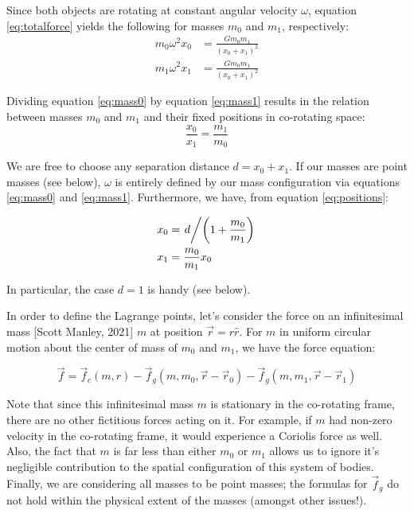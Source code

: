 \documentclass[twoside,11pt]{article}
\begin{document}
Since both objects are rotating at constant angular velocity $\omega$, equation \eqref{eq:totalforce} yields the following for masses $m_0$ and $m_1$, respectively:
\begin{align}
m_0 \omega^2 x_0 &= \frac{G m_0 m_1}{\left( x_0 + x_1 \right)^2} \label{eq:mass0} \\
m_1 \omega^2 x_1 &= \frac{G m_0 m_1}{\left( x_0 + x_1 \right)^2} \label{eq:mass1}
\end{align}

Dividing equation \eqref{eq:mass0} by equation \eqref{eq:mass1} results in the relation between masses $m_0$ and $m_1$ and their fixed positions in co-rotating space:
\begin{equation}
\frac{x_0}{x_1} = \frac{m_1}{m_0} \label{eq:positions}
\end{equation}

We are free to choose any separation distance $ d = x_0 + x_1 $. If our masses are point masses (see below), $ \omega $ is entirely defined by our mass configuration via equations \eqref{eq:mass0} and \eqref{eq:mass1}. Furthermore, we have, from equation \eqref{eq:positions}:

\begin{align}
x_0 &= \left. d \middle/ \left(1 + \frac{m_0}{m_1} \right) \right. \nonumber \\ 
x_1 &= \frac{m_0}{m_1} x_0 \nonumber
\end{align}

In particular, the case $ d = 1 $ is handy (see below).

In order to define the Lagrange points, let's consider the force on an infinitesimal mass [Scott Manley, 2021] $m$ at position $\vec{r} = r\hat{r}$. For $m$ in uniform circular motion about the center of mass of $m_0$ and $m_1$, we have the force equation:

\begin{equation}
\vec{f} = \vec{f}_c\left(m,r\right) - \vec{f}_g\left(m, m_0, \vec{r}-\vec{r}_0\right) - \vec{f}_g\left(m, m_1, \vec{r}-\vec{r}_1\right) \label{eq:mforce}
\end{equation}

Note that since this infinitesimal mass $m$ is stationary in the co-rotating frame, there are no other fictitious forces acting on it. For example, if $m$ had non-zero velocity in the co-rotating frame, it would experience a Coriolis force as well. Also, the fact that $m$ is far less than either $m_0$ or $m_1$ allows us to ignore it's negligible contribution to the spatial configuration of this system of bodies. Finally, we are considering all masses to be point masses; the formulas for $\vec{f}_g$ do not hold within the physical extent of the masses (amongst other issues!).
\end{document}
